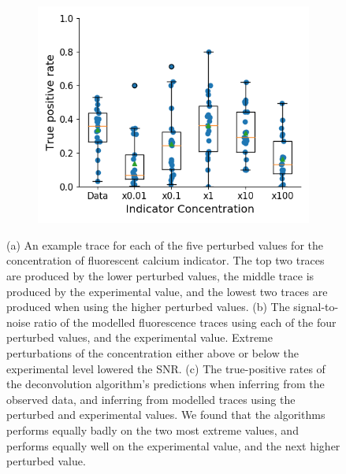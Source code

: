 \documentclass[a4paper,12pt]{article}
\theoremstyle{definition}
\begin{document}
\begin{figure}[p]
\begin{subfigure}{0.4\textwidth}
        \includegraphics[width=\linewidth]{figures/indictor_perturbed_oasis_first_paper.png}
        \caption{}
    \end{subfigure}
    \caption{(a) An example trace for each of the five perturbed values for the concentration of fluorescent calcium indicator. The top two traces are produced by the lower perturbed values, the middle trace is produced by the experimental value, and the lowest two traces are produced when using the higher perturbed values. (b) The signal-to-noise ratio of the modelled fluorescence traces using each of the four perturbed values, and the experimental value. Extreme perturbations of the concentration either above or below the experimental level lowered the SNR. (c) The true-positive rates of the deconvolution algorithm's predictions when inferring from the observed data, and inferring from modelled traces using the perturbed and experimental values. We found that the algorithms performs equally badly on the two most extreme values, and performs equally well on the experimental value, and the next higher perturbed value.}
    \label{fig:indicator_perturbed}
\end{figure}
\end{document}
